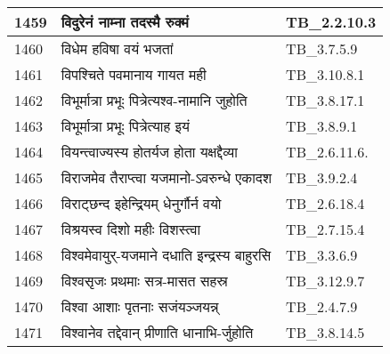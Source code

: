 \documentclass[17pt]{extarticle}
\begin{document}
\begin{longtable}{||p{0.4in}||p{4.9in}||p{0.9in}||}
    1459 & विदुरेनं नाम्ना तदस्मै रुक्मं & TB\_2.2.10.3       \\
    
    \hline
        
    1460 & विधेम हविषा वयं भजतां & TB\_3.7.5.9       \\
    
    \hline
        
    1461 & विपश्चिते पवमानाय गायत मही & TB\_3.10.8.1       \\
    
    \hline
        
    1462 & विभूर्मात्रा प्रभूः पित्रेत्यश्व{-}नामानि जुहोति & TB\_3.8.17.1       \\
    
    \hline
        
    1463 & विभूर्मात्रा प्रभूः पित्रेत्याह इयं & TB\_3.8.9.1       \\
    
    \hline
        
    1464 & वियन्त्वाज्यस्य होतर्यज होता यक्षद्दैव्या & TB\_2.6.11.6.       \\
    
    \hline
        
    1465 & विराजमेव तैराप्त्वा यजमानो{-}ऽवरुन्धे एकादश & TB\_3.9.2.4       \\
    
    \hline
        
    1466 & विराट्छन्द इहेन्द्रियम् धेनुर्गौर्न वयो & TB\_2.6.18.4       \\
    
    \hline
        
    1467 & विश्रयस्व दिशो महीः विशस्त्वा & TB\_2.7.15.4       \\
    
    \hline
        
    1468 & विश्वमेवायुर्{-}यजमाने दधाति इन्द्रस्य बाहुरसि & TB\_3.3.6.9       \\
    
    \hline
        
    1469 & विश्वसृजः प्रथमाः सत्र{-}मासत सहस्र & TB\_3.12.9.7       \\
    
    \hline
        
    1470 & विश्वा आशाः पृतनाः सजंयञ्जयन्न् & TB\_2.4.7.9       \\
    
    \hline
        
    1471 & विश्वानेव तद्देवान् प्रीणाति धानाभि{-}र्जुहोति & TB\_3.8.14.5       \\
    

\end{longtable}
\end{document}
